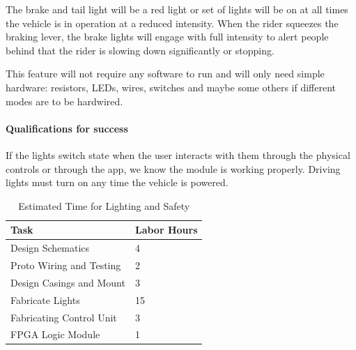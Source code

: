 \documentclass[12pt,article]{IEEEtran}
\begin{document}
            The brake and tail light will be a red light or set of lights will be on at all times the 
            vehicle is in operation at a reduced intensity.  When the rider squeezes the braking lever, 
            the brake lights will engage with full intensity to alert people behind that the rider is 
            slowing down significantly or stopping.
            
            This feature will not require any software to run and will only need simple hardware: resistors, 
            LEDs, wires, switches and maybe some others if different modes are to be hardwired.  
      
        \paragraph{\bfseries Qualifications for success}
           If the lights switch state when the user interacts with them through the physical controls or 
           through the app, we know the module is working properly. Driving lights must turn on any time the
           vehicle is powered.
     
        \begin{table}[H]        
            \renewcommand{\arraystretch}{1.3}
                \caption{Estimated Time for Lighting and Safety}
                
                \label{Estimated Time}
                
                \centering
                \begin{tabular}{p{5.5cm}|p{2cm}}
                \hline
                \bfseries   Task                        & \bfseries Labor Hours                         \\
                \hline\hline
                            Design Schematics           & 4                                             \\
                            Proto Wiring and Testing    & 2                                             \\  
                            Design Casings and Mount    & 3                                             \\  
                            Fabricate Lights            & 15                                            \\
                            Fabricating Control Unit    & 3                                             \\
                            FPGA Logic Module           & 1                                             \\  
                            \hline  
                \end{tabular}
        \end{table}
    
\end{document}
